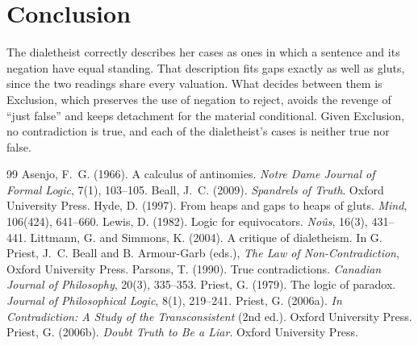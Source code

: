 \documentclass{situationist-preprint}
\begin{document}
\section{Conclusion}

The dialetheist correctly describes her cases as ones in which a sentence and its negation have equal standing. That description fits gaps exactly as well as gluts, since the two readings share every valuation. What decides between them is Exclusion, which preserves the use of negation to reject, avoids the revenge of \enquote{just false} and keeps detachment for the material conditional. Given Exclusion, no contradiction is true, and each of the dialetheist's cases is neither true nor false.

\begin{thebibliography}{99}\small
{} Asenjo, F.~G. (1966). A calculus of antinomies. \emph{Notre Dame Journal of Formal Logic}, 7(1), 103--105.
 Beall, J.~C. (2009). \emph{Spandrels of Truth}. Oxford University Press.
 Hyde, D. (1997). From heaps and gaps to heaps of gluts. \emph{Mind}, 106(424), 641--660.
 Lewis, D. (1982). Logic for equivocators. \emph{Noûs}, 16(3), 431--441.
 Littmann, G. and Simmons, K. (2004). A critique of dialetheism. In G. Priest, J.~C. Beall and B. Armour-Garb (eds.), \emph{The Law of Non-Contradiction}, Oxford University Press.
 Parsons, T. (1990). True contradictions. \emph{Canadian Journal of Philosophy}, 20(3), 335--353.
 Priest, G. (1979). The logic of paradox. \emph{Journal of Philosophical Logic}, 8(1), 219--241.
 Priest, G. (2006a). \emph{In Contradiction: A Study of the Transconsistent} (2nd ed.). Oxford University Press.
 Priest, G. (2006b). \emph{Doubt Truth to Be a Liar}. Oxford University Press.
\end{thebibliography}
\end{document}
